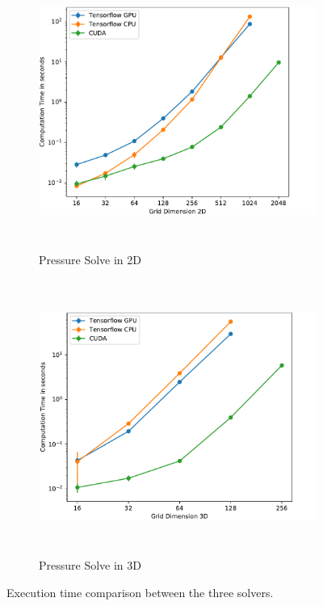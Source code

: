 \begin{figure}[t]
\centering
	\begin{subfigure}[b]{1\textwidth}
		\centering
		\includegraphics[height=9cm, width=14cm]{figures/performance_2d}

		\caption{Pressure Solve in 2D}
	\end{subfigure}
	\begin{subfigure}[b]{1\textwidth}
		\centering
		\includegraphics[height=9cm, width=14cm]{figures/performance_3d}

		\caption{Pressure Solve in 3D}
	\end{subfigure}

\caption{Execution time comparison between the three solvers.}	
\end{figure}

